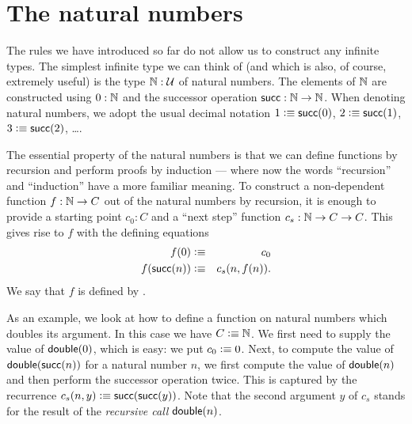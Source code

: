 \section{The natural numbers}
\label{sec:inductive-types}

The rules we have introduced so far do not allow us to construct any infinite types.
The simplest infinite type we can think of (and which is also, of course, extremely useful) is the type $\mathbb{N} : \mathcal{U}$ of natural numbers.
The elements of $\mathbb{N}$ are constructed using $0 : \mathbb{N}$ and the successor operation $\mathsf{succ} : \mathbb{N} \to \mathbb{N}$.
When denoting natural numbers, we adopt the usual decimal notation $1 \vcentcolon\equiv \mathsf{succ}(0)$, $2 \vcentcolon\equiv \mathsf{succ}(1)$, $3 \vcentcolon\equiv \mathsf{succ}(2)$, \dots.

The essential property of the natural numbers is that we can define functions by recursion and perform proofs by induction --- where now the words ``recursion'' and ``induction'' have a more familiar meaning.
To construct a non-dependent function $f : \mathbb{N} \to C$ out of the natural numbers by recursion, it is enough to provide a starting point $c_0 : C$ and a ``next step'' function $c_s : \mathbb{N} \to C \to C$.
This gives rise to $f$ with the defining equations
\begin{eqnarray*}
  f(0) & \vcentcolon\equiv & c_0 \\
  f(\mathsf{succ}(n)) & \vcentcolon\equiv & c_s(n,f(n)).
\end{eqnarray*}
We say that $f$ is defined by .

As an example, we look at how to define a function on natural numbers which doubles its argument.
In this case we have $C\vcentcolon\equiv \mathbb{N}$.
We first need to supply the value of $\mathsf{double}(0)$, which is easy: we put $c_0 \vcentcolon\equiv 0$.
Next, to compute the value of $\mathsf{double}(\mathsf{succ}(n))$ for a natural number $n$, we first compute the value of $\mathsf{double}(n)$ and then perform the successor operation twice.
This is captured by the recurrence $c_s(n,y) \vcentcolon\equiv \mathsf{succ}(\mathsf{succ}(y))$.
Note that the second argument $y$ of $c_s$ stands for the result of the \emph{recursive call} $\mathsf{double}(n)$.

